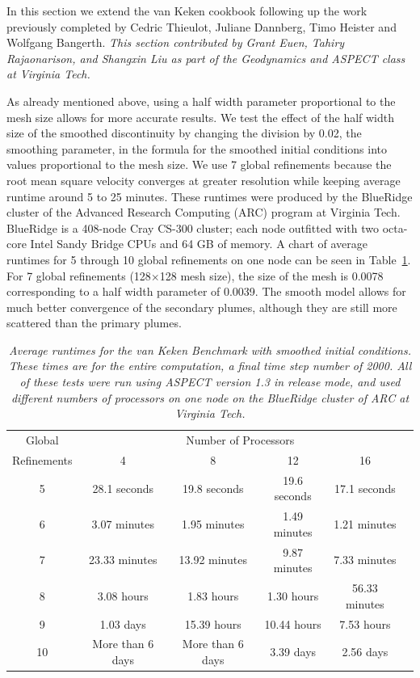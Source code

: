 \documentclass{article}
\begin{document}
In this section we extend the van Keken cookbook following up the work previously completed by Cedric Thieulot, Juliane Dannberg,
Timo Heister and Wolfgang Bangerth.  \textit{This section contributed by Grant Euen, Tahiry Rajaonarison, and Shangxin Liu as part of the Geodynamics and ASPECT class at Virginia Tech.}  

As already mentioned above, using a half width parameter proportional to the mesh size allows for more accurate results.  We test the effect of the half width size of the smoothed discontinuity by changing the division by 0.02, the smoothing parameter, in the formula for the smoothed initial conditions into values proportional to the mesh size.  We use 7 global refinements because the root mean square velocity converges at greater resolution while keeping average runtime around 5 to 25 minutes.  These runtimes were produced by the BlueRidge cluster of the Advanced Research Computing (ARC) program at Virginia Tech.  BlueRidge is a 408-node Cray CS-300 cluster; each node outfitted with two octa-core Intel Sandy Bridge CPUs and 64 GB of memory.  A chart of average runtimes for 5 through 10 global refinements on one node can be seen in Table~\ref{tab:runtime-table}.  For 7 global refinements (128$\times$128 mesh size), the size of the mesh is 0.0078 corresponding to a half width parameter of 0.0039.  The smooth model allows for much better convergence of the secondary plumes, although they are still more scattered than the primary plumes.

\begin{table}[htb]
        \center
        \begin{tabular}{|c|ccccc|}
                \hline
                Global & \multicolumn{4}{|c|}{Number of Processors} \\
                Refinements & 4 & 8 & 12 & 16
                \\ \hline
                5 & 28.1 seconds & 19.8 seconds & 19.6 seconds & 17.1 seconds \\
                6 & 3.07 minutes & 1.95 minutes & 1.49 minutes & 1.21 minutes \\
                7 & 23.33 minutes & 13.92 minutes & 9.87 minutes & 7.33 minutes \\
                8 & 3.08 hours & 1.83 hours & 1.30 hours & 56.33 minutes \\
                9 & 1.03 days & 15.39 hours & 10.44 hours & 7.53 hours \\
                10 & More than 6 days & More than 6 days & 3.39 days & 2.56 days \\ \hline
        \end{tabular}
        \caption{\it Average runtimes for the van Keken Benchmark with smoothed initial conditions.  These times are for the entire computation, a final time step number of 2000.  All of these tests were run using ASPECT version 1.3 in release mode, and used different numbers of processors on one node on the BlueRidge cluster of ARC at Virginia Tech.}
        \label{tab:runtime-table}
\end{table}
\end{document}
